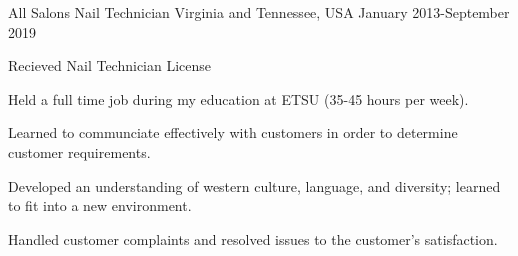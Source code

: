

\begin{cventries}

  \cventry
    {All Salons} %
    {Nail Technician} %
    {Virginia and Tennessee, USA} %
    {January 2013-September 2019} %
    {
      \begin{cvitems} %
      \item Recieved Nail Technician License
      \item Held a full time job during my education at ETSU (35-45 hours per week).
      \item Learned to communciate effectively with customers in order to determine customer requirements.
      \item Developed an understanding of western culture, language, and diversity; learned to fit into a new environment.
      \item Handled customer complaints and resolved issues to the customer's satisfaction.
      \end{cvitems}
    }
\end{cventries}
